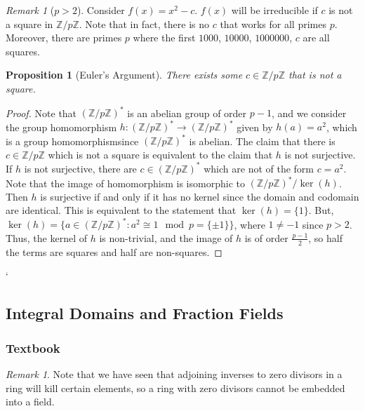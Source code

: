 \documentclass[12pt]{article}
\newtheorem{prop}[thm]{Proposition}
\theoremstyle{definition}
\theoremstyle{remark}
\newtheorem{rmk}[thm]{Remark}
\numberwithin{equation}{section}
\newcommand\Z{\mathbb Z}    %
\begin{document}
\vspace{15pt}


\begin{rmk}[$p > 2$]
        Consider $f(x) = x^2 - c$. $f(x)$ will be irreducible if $c$ is not a square in $\Z/p\Z$. Note that in fact, there is no $c$ that works for all primes $p$. Moreover, there are primes $p$ where the first $1000$, $10000$, $1000000$, $c$ are all squares.
\end{rmk}

\vspace{15pt}

\begin{prop}[Euler's Argument]
        There exists some $c \in \Z/p\Z$ that is not a square.
\end{prop}
\begin{proof}
        Note that $(\Z/p\Z)^*$ is an abelian group of order $p-1$, and we consider the group homomorphism $h:(\Z/p\Z)^*\rightarrow(\Z/p\Z)^*$ given by $h(a) = a^2$, which is a group homomorphismsince $(\Z/p\Z)^*$ is abelian. The claim that there is $c \in \Z/p\Z$ which is not a square is equivalent to the claim that $h$ is not surjective. If $h$ is not surjective, there are $c \in (\Z/p\Z)^*$ which are not of the form $c=a^2$. Note that the image of homomorphism is isomorphic to $(\Z/p\Z)^*/\ker(h)$. Then $h$ is surjective if and only if it has no kernel since the domain and codomain are identical. This is equivalent to the statement that $\ker(h) = \{1\}$. But, $\ker(h) = \{a \in (\Z/p\Z)^*:a^2 \cong 1\mod p = \{\pm 1\}\}$, where $1 \neq -1$ since $p > 2$. Thus, the kernel of $h$ is non-trivial, and the image of $h$ is of order $\frac{p-1}{2}$, so half the terms are squares and half are non-squares.
\end{proof}


\vspace{15pt}
`
\subsection{Integral Domains and Fraction Fields}



\subsubsection{Textbook}


\begin{rmk}
        Note that we have seen that adjoining inverses to zero divisors in a ring will kill certain elements, so a ring with zero divisors cannot be embedded into a field.
\end{rmk}
\end{document}
